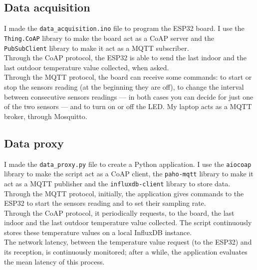 \documentclass[conference]{IEEEtran}
\begin{document}
\subsection{Data acquisition}
I made the \texttt{data\_acquisition.ino} file to program the ESP32 board. I use the \texttt{Thing.CoAP} library to make the board act as a CoAP server and the \texttt{PubSubClient} library to make it act as a MQTT subscriber.\\
Through the CoAP protocol, the ESP32 is able to send the last indoor and the last outdoor temperature value collected, when asked.\\
Through the MQTT protocol, the board can receive some commands: to start or stop the sensors reading (at the beginning they are off), to change the interval between consecutive sensors readings --- in both cases you can decide for just one of the two sensors --- and to turn on or off the LED. My laptop acts as a MQTT broker, through Mosquitto.

\subsection{Data proxy}
I made the \texttt{data\_proxy.py} file to create a Python application. I use the \texttt{aiocoap} library to make the script act as a CoAP client, the \texttt{paho-mqtt} library to make it act as a MQTT publisher and the \texttt{influxdb-client} library to store data.\\
Through the MQTT protocol, initially, the application gives commands to the ESP32 to start the sensors reading and to set their sampling rate.\\
Through the CoAP protocol, it periodically requests, to the board, the last indoor and the last outdoor temperature value collected. The script continuously stores these temperature values on a local InfluxDB instance.\\
The network latency, between the temperature value request (to the ESP32) and its reception, is continuously monitored; after a while, the application evaluates the mean latency of this process.
\end{document}
